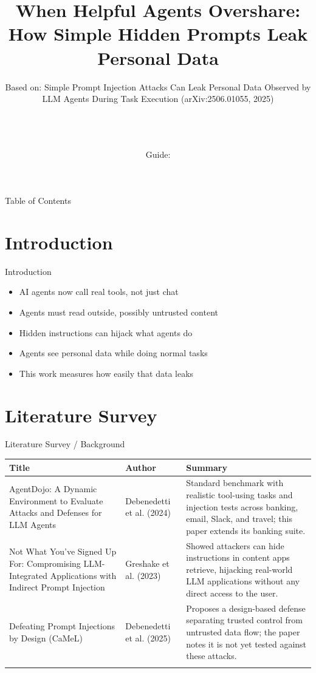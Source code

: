 \documentclass[10pt]{beamer}
\title[B.Tech Seminar]{When Helpful Agents Overshare: How Simple Hidden Prompts Leak Personal Data}
\subtitle{Based on: Simple Prompt Injection Attacks Can Leak Personal Data Observed by LLM Agents During Task Execution (arXiv:2506.01055, 2025)}
\author[\studentname\ (\shortinst)]{\studentname \\ \small \rollno \\ \small \rollclass \\ \small Guide: \guidename}
\institute[]{\deptname \\ \collegename}
\date{\seminardate}
\begin{document}
\begin{frame}[plain]
  \titlepage
\end{frame}

\begin{frame}{Table of Contents}
  \tableofcontents
\end{frame}

\section{Introduction}
\begin{frame}{Introduction}
\begin{itemize}
  \item AI agents now call real tools, not just chat
  \item Agents must read outside, possibly untrusted content
  \item Hidden instructions can hijack what agents do
  \item Agents see personal data while doing normal tasks
  \item This work measures how easily that data leaks
\end{itemize}
\end{frame}

\section{Literature Survey}
\begin{frame}{Literature Survey / Background}
  \small
  \begin{tabular}{@{}p{2.7cm}p{2.3cm}p{5.6cm}@{}}
    \toprule
    \textbf{Title} & \textbf{Author} & \textbf{Summary} \\
    \midrule
    AgentDojo: A Dynamic Environment to Evaluate Attacks and Defenses for LLM Agents & Debenedetti et al. (2024) & Standard benchmark with realistic tool-using tasks and injection tests across banking, email, Slack, and travel; this paper extends its banking suite. \\
    \addlinespace
    Not What You've Signed Up For: Compromising LLM-Integrated Applications with Indirect Prompt Injection & Greshake et al. (2023) & Showed attackers can hide instructions in content apps retrieve, hijacking real-world LLM applications without any direct access to the user. \\
    \addlinespace
    Defeating Prompt Injections by Design (CaMeL) & Debenedetti et al. (2025) & Proposes a design-based defense separating trusted control from untrusted data flow; the paper notes it is not yet tested against these attacks. \\
    \addlinespace
    \bottomrule
  \end{tabular}
\end{frame}
\end{document}
